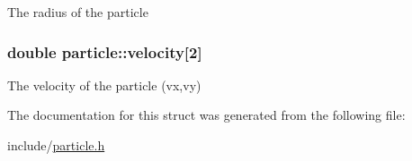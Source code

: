 The radius of the particle \hypertarget{structparticle_a51c152e3485304dad23614ca1dcf416f}{
\subsubsection[{velocity}]{\setlength{\rightskip}{0pt plus 5cm}double particle\-::velocity\mbox{[}2\mbox{]}}}\label{structparticle_a51c152e3485304dad23614ca1dcf416f}
The velocity of the particle (vx,vy) 

The documentation for this struct was generated from the following file\-:\begin{DoxyCompactItemize}
\item 
include/\hyperlink{particle_8h}{particle.\-h}\end{DoxyCompactItemize}
